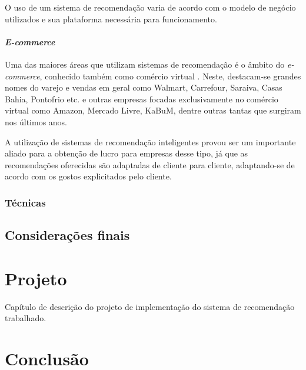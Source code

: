 \documentclass[
	12pt,				%
	openright,			%
	twoside,			%
	a4paper,			%
	english,			%
	french,				%
	spanish,			%
	brazil				%
	]{abntex2}
\begin{document}
O uso de um sistema de recomendação varia de acordo com o modelo de negócio utilizados e sua plataforma necessária para funcionamento.


\subsubsection{\emph{E-commerce}}

Uma das maiores áreas que utilizam sistemas de recomendação é o âmbito do \emph{e-commerce}, conhecido também como comércio virtual \cite{schafer1999recommender}. Neste, destacam-se grandes nomes do varejo e vendas em geral como Walmart, Carrefour, Saraiva, Casas Bahia, Pontofrio etc. e outras empresas focadas exclusivamente no comércio virtual como Amazon, Mercado Livre, KaBuM, dentre outras tantas que surgiram nos últimos anos. \cite{schafer2001commerce}

A utilização de sistemas de recomendação inteligentes provou ser um importante aliado para a obtenção de lucro para empresas desse tipo, já que as recomendações oferecidas são adaptadas de cliente para cliente, adaptando-se de acordo com os gostos explicitados pelo cliente.

\subsection{Técnicas}

\section{Considerações finais}

\chapter{Projeto}\label{cap_projeto}

Capítulo de descrição do projeto de implementação do sistema de recomendação trabalhado.


\chapter{Conclusão}
\end{document}
